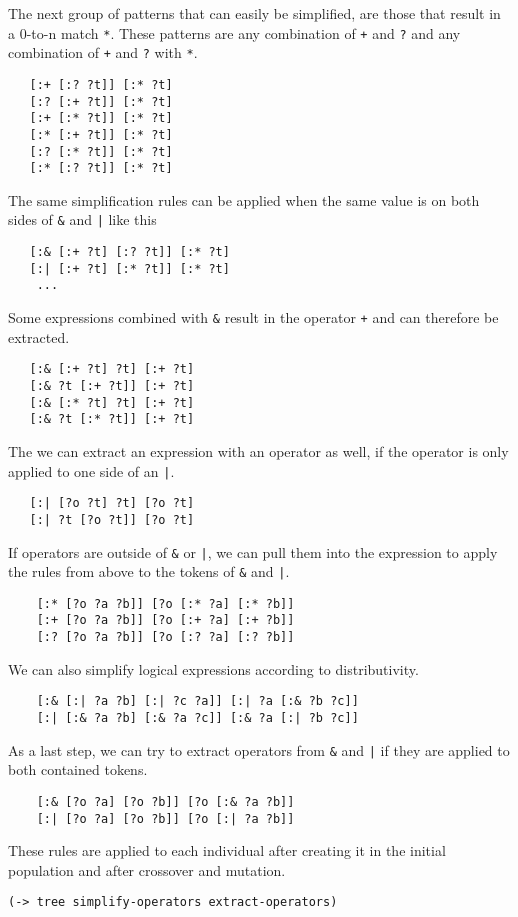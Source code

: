 \documentclass[runningheads]{llncs}
\begin{document}
The next group of patterns that can easily be simplified, are those that result in a 0-to-n match \texttt{*}. These patterns are any combination of \texttt{+} and \texttt{?} and any combination of \texttt{+} and \texttt{?} with \texttt{*}.
\begin{verbatim}
   [:+ [:? ?t]] [:* ?t]
   [:? [:+ ?t]] [:* ?t]
   [:+ [:* ?t]] [:* ?t]
   [:* [:+ ?t]] [:* ?t]
   [:? [:* ?t]] [:* ?t]
   [:* [:? ?t]] [:* ?t]
\end{verbatim}
The same simplification rules can be applied when the same value is on both sides of \texttt{\&} and \texttt{|} like this
\begin{verbatim}
   [:& [:+ ?t] [:? ?t]] [:* ?t]
   [:| [:+ ?t] [:* ?t]] [:* ?t]
    ...
\end{verbatim}
Some expressions combined with \texttt{\&} result in the operator \texttt{+} and can therefore be extracted.
\begin{verbatim}
   [:& [:+ ?t] ?t] [:+ ?t]
   [:& ?t [:+ ?t]] [:+ ?t]
   [:& [:* ?t] ?t] [:+ ?t]
   [:& ?t [:* ?t]] [:+ ?t]
\end{verbatim}
The we can extract an expression with an operator as well, if the operator is only applied to one side of an \texttt{|}.
\begin{verbatim}
   [:| [?o ?t] ?t] [?o ?t]
   [:| ?t [?o ?t]] [?o ?t]
\end{verbatim}
If operators are outside of \texttt{\&} or \texttt{|}, we can pull them into the expression to apply the rules from above to the tokens of \texttt{\&} and \texttt{|}.
\begin{verbatim}
    [:* [?o ?a ?b]] [?o [:* ?a] [:* ?b]]
    [:+ [?o ?a ?b]] [?o [:+ ?a] [:+ ?b]]
    [:? [?o ?a ?b]] [?o [:? ?a] [:? ?b]]
\end{verbatim}
We can also simplify logical expressions according to distributivity.
\begin{verbatim}
    [:& [:| ?a ?b] [:| ?c ?a]] [:| ?a [:& ?b ?c]]
    [:| [:& ?a ?b] [:& ?a ?c]] [:& ?a [:| ?b ?c]]
\end{verbatim}
As a last step, we can try to extract operators from \texttt{\&} and \texttt{|} if they are applied to both contained tokens.
\begin{verbatim}
    [:& [?o ?a] [?o ?b]] [?o [:& ?a ?b]]
    [:| [?o ?a] [?o ?b]] [?o [:| ?a ?b]]
\end{verbatim}
These rules are applied to each individual after creating it in the initial population and after crossover and mutation.
\begin{lstlisting}
(-> tree simplify-operators extract-operators)
\end{lstlisting}
\end{document}
